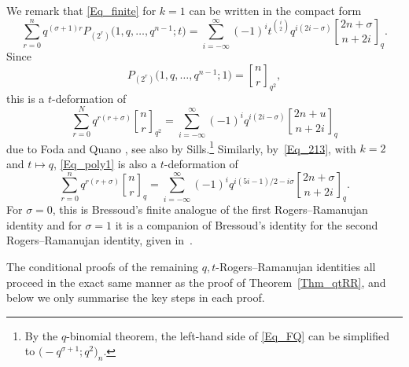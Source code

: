 \documentclass[pdftex]{sigma}
\numberwithin{equation}{section}
\newcommand{\qbin}[2]{\genfrac{[}{]}{0pt}{}{#1}{#2}}
\begin{document}
We remark that \eqref{Eq_finite} for $k=1$ can be written in the
compact form
\begin{equation}\label{Eq_poly1}
\sum_{r=0}^n q^{(\sigma+1)r} P_{(2^r)}\bigl(1,q,\dots,q^{n-1};t\bigr)
=\sum_{i=-\infty}^{\infty}
(-1)^i t^{\binom{i}{2}} q^{i(2i-\sigma)} \qbin{2n+\sigma}{n+2i}_q.
\end{equation}
Since
\[
P_{(2^r)}\bigl(1,q,\dots,q^{n-1};1\bigr)=\qbin{n}{r}_{q^2},
\]
this is a $t$-deformation of
\begin{equation}\label{Eq_FQ}
\sum_{r=0}^N q^{r(r+\sigma)} \qbin{n}{r}_{q^2}
=\sum_{i=-\infty}^{\infty}(-1)^i q^{i(2i-\sigma)}\qbin{2n+u}{n+2i}_q
\end{equation}
due to Foda and Quano \cite[Theorem 1.2, $k=2$]{FQ95}, see also
\cite[equations~(3.2-b) and (3.3-b)]{Sills03} by Sills.\footnote{By the
$q$-binomial theorem, the left-hand side of \eqref{Eq_FQ}
can be simplified to $\bigl(-q^{\sigma+1};q^2\bigr)_n$.}
Similarly, by~\eqref{Eq_213}, with $k=2$ and $t\mapsto q$,
\eqref{Eq_poly1} is also a $t$-deformation of
\[
\sum_{r=0}^n q^{r(r+\sigma)} \qbin{n}{r}_q
=\sum_{i=-\infty}^{\infty}
(-1)^i q^{i(5i-1)/2-i\sigma} \qbin{2n+\sigma}{n+2i}_q.
\]
For $\sigma=0$, this is Bressoud's finite analogue of the first
Rogers--Ramanujan identity \cite[equation~(1.1)]{Bressoud81}
and for $\sigma=1$ it is a companion of Bressoud's identity
for the second Rogers--Ramanujan identity, given in~\cite[p.~249]{W01}.

The conditional proofs of the remaining $q,t$-Rogers--Ramanujan
identities all proceed in the exact same manner as the proof of
Theorem~\ref{Thm_qtRR}, and below we only summarise the key
steps in each proof.
\end{document}
